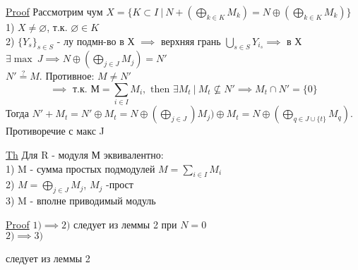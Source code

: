 \documentclass[a4paper]{article}
\begin{document}
\begin{tcolorbox}
\underline{Proof} Рассмотрим чум $ X = \{ K \subset I \ | \ N + (\bigoplus_{k \in K}
M_k) = N \oplus (\bigoplus_{k \in K}M_k) \}$ \\
1) $ X \neq \varnothing $, т.к. $ \varnothing \in K $ \\
2) $ \{ Y_s \}_{s \in S} $ - лу подмн-во в Х $ \implies $ верхняя грань 
$ \bigcup_{s \in S} Y_{i_s} \implies $ в Х $ \exists \max\  J \implies
N \oplus (\bigoplus_{j \in J}M_j) = N'$ \\
$ N' \stackrel{?}{=} M $. Противное: $ M \neq N' $  
\[
    \implies \text{ т.к. }М = \sum_{i \in I} M_i, \text{ then } \exists M_t \ | \ 
    M_t \not\subseteq N' \implies M_t \cap N' = \{0\}
\]
Тогда $ N' + M_t = N' \oplus M_t = N \oplus (\bigoplus_{j \in J}) M_j)
\oplus M_t = N \oplus (\bigoplus_{q \in J \cup \{t\}}M_q)$. Противоречие с макс J 
\end{tcolorbox}

\begin{tcolorbox}
\underline{Th} Для R - модуля М эквивалентно:\\
1) M - сумма простых подмодулей $ M = \sum_{i \in I} M_i $ \\
2) $ M = \bigoplus_{j \in J} M_j $, $ M_j $ -прост\\
3) M - вполне приводимый модуль

\underline{Proof} $ 1) \implies 2) $ следует из леммы 2 при $ N = 0 $\\
$ 2) \implies 3) $ 
\end{tcolorbox} следует из леммы 2
\end{document}
